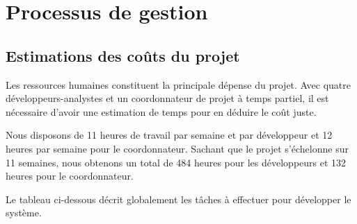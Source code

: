 \documentclass{mistcoursedoc}
\begin{document}
\section{Processus de gestion}

\subsection{Estimations des coûts du projet}\label{coûts}

Les ressources humaines constituent la principale dépense du projet.
Avec quatre développeurs-analystes et un coordonnateur de projet à temps partiel,
il est nécessaire d’avoir une estimation de temps pour en déduire le coût juste.

Nous disposons de 11 heures de travail par semaine et par développeur et 12 heures par semaine pour le coordonnateur.
Sachant que le projet s’échelonne sur 11 semaines, nous obtenons un total de 484 heures pour les développeurs
et 132 heures pour le coordonnateur.

Le tableau ci-dessous décrit globalement les tâches à effectuer pour développer le système.
\end{document}
